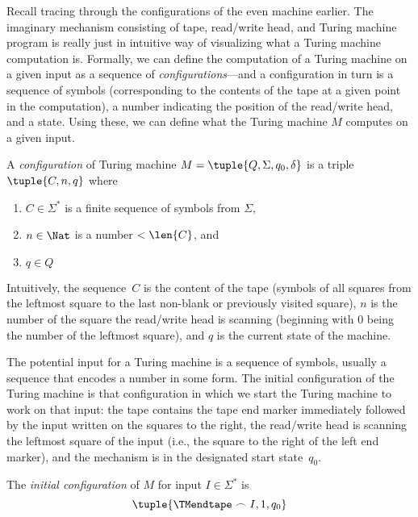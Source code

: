 \documentclass[../../../include/open-logic-section]{subfiles}
\begin{document}

\begin{explain}
Recall tracing through the configurations of the even machine earlier.
The imaginary mechanism consisting of tape, read/write head, and
Turing machine program is really just in intuitive way of visualizing
what a Turing machine computation is.  Formally, we can define the
computation of a Turing machine on a given input as a sequence of
\emph{configurations}---and a configuration in turn is a sequence of
symbols (corresponding to the contents of the tape at a given point in
the computation), a number indicating the position of the read/write
head, and a state.  Using these, we can define what the Turing machine
$M$ computes on a given input.
\end{explain}

\begin{defn}
A \emph{configuration} of Turing machine $M = \tuple{Q, \Sigma, q_0,
\delta}$ is a triple $\tuple{C, n, q}$ where
\begin{enumerate}
\item $C \in \Sigma^*$ is a finite sequence of symbols from $\Sigma$,
\item $n \in \Nat$ is a number $< \len{C}$, and
\item $q \in Q$
\end{enumerate}
Intuitively, the sequence~$C$ is the content of the tape (symbols of
all squares from the leftmost square to the last non-blank or
previously visited square), $n$ is the number of the square the
read/write head is scanning (beginning with $0$ being the number of
the leftmost square), and $q$ is the current state of the machine.
\end{defn}

\begin{explain}
The potential input for a Turing machine is a sequence of symbols,
usually a sequence that encodes a number in some form.  The initial
configuration of the Turing machine is that configuration in which we
start the Turing machine to work on that input: the tape contains the
tape end marker immediately followed by the input written on the
squares to the right, the read/write head is scanning the leftmost
square of the input (i.e., the square to the right of the left end
marker), and the mechanism is in the designated start state~$q_0$.
\end{explain}

\begin{defn}
The \emph{initial configuration} of $M$ for input $I \in \Sigma^*$ is
\[
\tuple{\TMendtape \frown I, 1, q_0}
\]
\end{defn}
\end{document}
